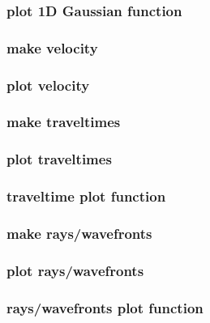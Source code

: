 \begin{frame}
\end{frame}
\cwpnote{}

\begin{frame} \frametitle{plot 1D Gaussian function}
\end{frame}
\cwpnote{}

\begin{frame}
\end{frame}
\cwpnote{}


\begin{frame} \frametitle{make velocity}
\end{frame}
\cwpnote{}

\begin{frame} \frametitle{plot velocity}
\end{frame}
\cwpnote{}


\begin{frame} \frametitle{make traveltimes}
\end{frame}
\cwpnote{}

\begin{frame} \frametitle{plot traveltimes}
\end{frame}
\cwpnote{}

\begin{frame} \frametitle{traveltime plot function}
\end{frame}
\cwpnote{}

\begin{frame}
\end{frame}
\cwpnote{}


\begin{frame} \frametitle{make rays/wavefronts}
\end{frame}
\cwpnote{}

\begin{frame} \frametitle{plot rays/wavefronts}
\end{frame}
\cwpnote{}

\begin{frame} \frametitle{rays/wavefronts plot function}
\end{frame}
\cwpnote{}

